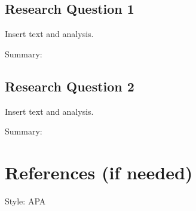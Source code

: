 \documentclass[]{article}
\begin{document}
\hypertarget{research-question-1}{%
\subsection{Research Question 1}\label{research-question-1}}

Insert text and analysis.

Summary:

\hypertarget{research-question-2}{%
\subsection{Research Question 2}\label{research-question-2}}

Insert text and analysis.

Summary:

\hypertarget{references-if-needed}{%
\section{References (if needed)}\label{references-if-needed}}

Style: APA
\end{document}
